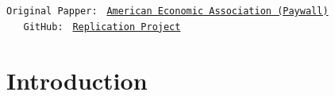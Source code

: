\documentclass[titlepage,letterpaper]{\econtex}
\begin{document}
\vspace{-1cm}
\begin{authorsinfo}
\end{authorsinfo}

\hypertarget{links}{}
\medskip
\begin{small}
  \parbox{\textwidth}{
    \begin{center}
      \begin{tabbing}
        \texttt{Original Papper:~} \= \= \texttt{\href{https://www.aeaweb.org/articles?id=10.1257/aer.97.5.1939}{American Economic Association (Paywall)}} \\
        \texttt{~~~GitHub:~} \> \> \texttt{\href{https://github.com/raytobing/final_project/tree/master/replication}{Replication Project}} \\
      \end{tabbing}
    \end{center}

  } 
\end{small}

\titlepagefinish

\setcounter{page}{1}

\setcounter{footnote}{0}


\hypertarget{Introduction}{}
\section{Introduction}\label{sec:Intro}
\end{document}
